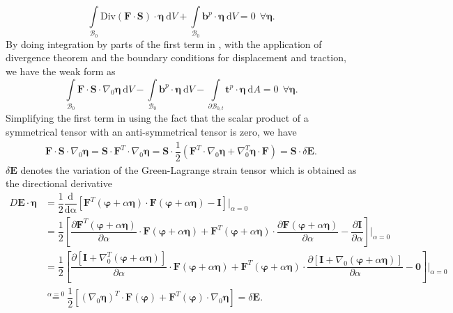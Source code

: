\begin{equation}
\int\limits_{\mathcal{B}_0} \text{Div}(\mathbf{F} \cdot \mathbf{S}) \cdot \bm{\eta} \ \mathrm{d}V + \int\limits_{\mathcal{B}_0} \mathbf{b}^p \cdot \bm{\eta} \ \mathrm{d}V = 0 \ \ \forall \bm{\eta}.
\label{eq:2.7}
\end{equation}
By doing integration by parts of the first term in , with the application of divergence theorem and the boundary conditions for displacement and traction, we have the weak form as 
\begin{equation}
\int\limits_{\mathcal{B}_0} \mathbf{F} \cdot \mathbf{S} \cdot \nabla_0 \bm{\eta} \ \mathrm{d}V - \int\limits_{\mathcal{B}_0} \mathbf{b}^p \cdot \bm{\eta} \ \mathrm{d}V - \int\limits_{\mathcal{\partial B}_{0,t}} \mathbf{t}^p \cdot \bm{\eta} \ \mathrm{d}A = 0 \ \ \forall \bm{\eta}.
\label{eq:2.8}
\end{equation}
Simplifying the first term in  using the fact that the scalar product of a symmetrical tensor with an anti-symmetrical tensor is zero, we have
\begin{align}
\mathbf{F} \cdot \mathbf{S} \cdot \nabla_0 \bm{\eta} = \mathbf{S} \cdot \mathbf{F}^T \cdot \nabla_0 \bm{\eta} = \mathbf{S} \cdot \dfrac{1}{2} (\mathbf{F}^T \cdot \nabla_0 \bm{\eta} + \nabla_0^T \bm{\eta} \cdot \mathbf{F}) = \mathbf{S} \cdot \delta \mathbf{E}.
\label{eq:2.9}
\end{align}
$\delta \mathbf{E}$ denotes the variation of the Green-Lagrange strain tensor which is obtained as the directional derivative
\begin{align}
D\mathbf{E} \cdot \bm{\eta} &= \dfrac{1}{2} \dfrac{\mathrm{d}}{\mathrm{d\alpha}} \left[ \mathbf{F}^T (\bm{\varphi} + \alpha \bm{\eta}) \cdot \mathbf{F}(\bm{\varphi} + \alpha \bm{\eta}) - \mathbf{I} \right] \Big|_{\alpha = 0} \nonumber \\
&= \dfrac{1}{2} \left[ \dfrac{\partial \mathbf{F}^T (\bm{\varphi} + \alpha \bm{\eta})}{\partial \alpha} \cdot \mathbf{F}(\bm{\varphi} + \alpha \bm{\eta}) + \mathbf{F}^T (\bm{\varphi} + \alpha \bm{\eta}) \cdot \dfrac{\partial \mathbf{F}(\bm{\varphi} + \alpha \bm{\eta})}{\partial \alpha} - \dfrac{\partial \mathbf{I}}{\partial \alpha} \right] \Bigg|_{\alpha = 0} \nonumber \\
&= \dfrac{1}{2} \left[ \dfrac{\partial \left[ \mathbf{I} + \nabla_0^T (\bm{\varphi} + \alpha \bm{\eta}) \right]}{\partial \alpha} \cdot \mathbf{F}(\bm{\varphi} + \alpha \bm{\eta}) + \mathbf{F}^T (\bm{\varphi} + \alpha \bm{\eta}) \cdot \dfrac{\partial \left[ \mathbf{I} + \nabla_0 (\bm{\varphi} + \alpha \bm{\eta}) \right]}{\partial \alpha} - \mathbf{0} \right] \Bigg|_{\alpha = 0} \nonumber \\
&\stackrel{\alpha = 0}{=} \dfrac{1}{2} \left[ (\nabla_0 \bm{\eta})^T \cdot \mathbf{F} (\bm{\varphi}) + \mathbf{F}^T (\bm{\varphi}) \cdot \nabla_0 \bm{\eta} \right] = \delta \mathbf{E}.
\label{eq:2.10}
\end{align}
